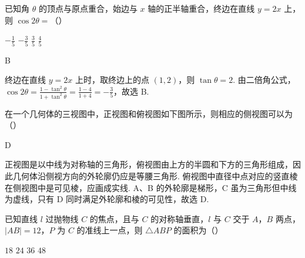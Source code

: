\begin{problem}
已知角 \(\theta\) 的顶点与原点重合，始边与 \(x\) 轴的正半轴重合，终边在直线 \(y = 2x\) 上，则 \(\cos 2\theta =\)（\quad）

\choices
    {\(-\frac{1}{5}\)}
    {\(-\frac{3}{5}\)}
    {\( \frac{3}{5} \)}
    {\( \frac{4}{5} \)}

\end{problem}

\begin{answer}
B
\end{answer}

\begin{solution}
终边在直线 \(y=2x\) 上时，取终边上的点 \((1,2)\)，则 \(\tan\theta=2\). 由二倍角公式，
\(\cos2\theta=\frac{1-\tan^2\theta}{1+\tan^2\theta}=\frac{1-4}{1+4}=-\frac{3}{5}\)，故选 B.
\end{solution}

\begin{problem}
在一个几何体的三视图中，正视图和俯视图如下图所示，则相应的侧视图可以为（\quad）


    {}
    {}
    {}

\end{problem}

\begin{answer}
D
\end{answer}

\begin{solution}
正视图是以中线为对称轴的三角形，俯视图由上方的半圆和下方的三角形组成，因此几何体沿侧视方向的外轮廓仍应是等腰三角形. 俯视图中直径中点对应的竖直棱在侧视图中是可见棱，应画成实线. A、B 的外轮廓是梯形，C 虽为三角形但中线为虚线，只有 D 同时满足外轮廓和棱的可见性，故选 D.
\end{solution}

\begin{problem}
已知直线 \(l\) 过抛物线 \(C\) 的焦点，且与 \(C\) 的对称轴垂直，\(l\) 与 \(C\) 交于 \(A\)，\(B\) 两点，\( \left|AB\right|=12 \)，\(P\) 为 \(C\) 的准线上一点，则 \( \triangle ABP \) 的面积为（\quad）

\choices
    {\(18\)}
    {\(24\)}
    {\(36\)}
    {\(48\)}

\end{problem}

